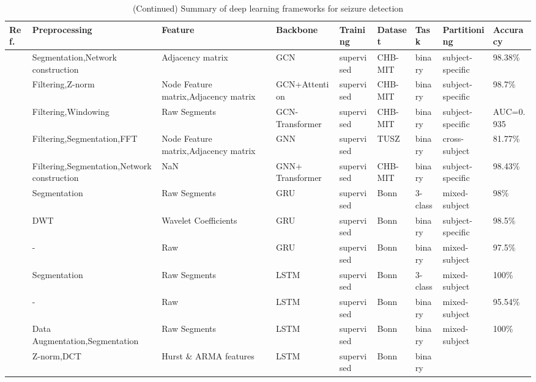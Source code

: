 \begin{table*}[ht]
\renewcommand{\arraystretch}{1.2}
\caption*{(Continued) Summary of deep learning frameworks for seizure detection}
\footnotesize
\begin{tabular}{p{0.4cm}p{2.8cm}p{2cm}p{1.5cm}p{1.9cm}p{1.9cm}p{0.8cm}p{1.8cm}p{2cm}}
\hline
\textbf{Ref.} & \textbf{Preprocessing} & \textbf{Feature} & \textbf{Backbone} & \textbf{Training} & \textbf{Dataset} & \textbf{Task} & \textbf{Partitioning} & \textbf{Accuracy} \\
\hline
~\cite{Seizure156} & Segmentation,Network construction & Adjacency matrix & GCN & supervised & CHB-MIT & binary & subject-specific & 98.38\% \\
~\cite{Seizure157} & Filtering,Z-norm & Node Feature \newline matrix,Adjacency matrix & GCN+Attention & supervised & CHB-MIT & binary & subject-specific & 98.7\% \\
~\cite{Seizure158} & Filtering,Windowing & Raw Segments & GCN-Transformer & supervised & CHB-MIT & binary & subject-specific & AUC=0.935 \\
~\cite{rahmani2023meta} & Filtering,Segmentation,FFT & Node Feature \newline matrix,Adjacency matrix & GNN & supervised & TUSZ & binary & cross-subject & 81.77\% \\
 ~\cite{Seizure160} & Filtering,Segmentation,\newline Network construction & NaN & GNN+ Transformer & supervised & CHB-MIT & binary & subject-specific & 98.43\% \\
~\cite{Seizure161} & Segmentation & Raw Segments & GRU & supervised & Bonn & 3-class & mixed-subject & 98\% \\
~\cite{Seizure162} & DWT & Wavelet Coefficients & GRU & supervised & Bonn & binary & subject-specific & 98.5\% \\
~\cite{Seizure163} & - & Raw & GRU & supervised & Bonn & binary & mixed-subject & 97.5\% \\
~\cite{Seizure164} & Segmentation & Raw Segments & LSTM & supervised & Bonn & 3-class & mixed-subject & 100\% \\
~\cite{Seizure165} & - & Raw & LSTM & supervised & Bonn & binary & mixed-subject & 95.54\% \\
~\cite{Seizure166} & Data Augmentation,\newline Segmentation & Raw Segments & LSTM & supervised & Bonn & binary & mixed-subject & 100\% \\
~\cite{Seizure167} & Z-norm,DCT & Hurst \& ARMA features & LSTM & supervised & Bonn & binary \newline

\end{tabular}
\end{table*}
